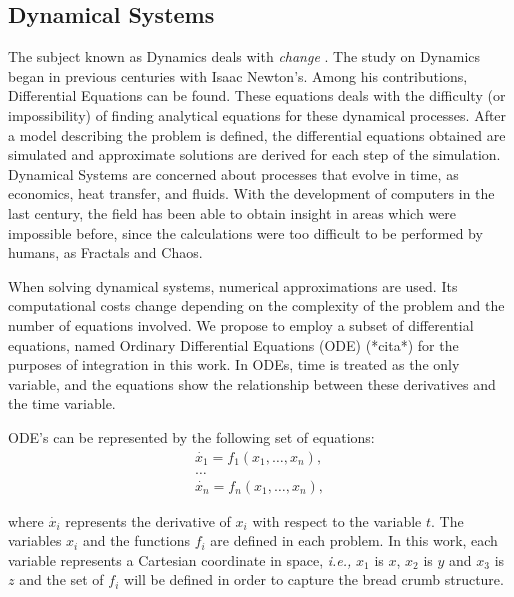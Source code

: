 \documentclass[oneside,a4paper,english,links]{amca}
\begin{document}
\subsection{Dynamical Systems}

The subject known as Dynamics deals with {\em change} \citep{Strogatz2001}. The study on Dynamics began in previous centuries with Isaac Newton's. Among his contributions, Differential Equations can be found. These equations deals with the difficulty (or impossibility) of finding analytical equations for these dynamical processes. After a model describing the problem is defined, the differential equations obtained are simulated and approximate solutions are derived for each step of the simulation. Dynamical Systems are concerned about processes that evolve in time, as economics, heat transfer, and fluids. With the development of computers in the last century, the field has been able to obtain insight in areas which were impossible before, since the calculations were too difficult to be performed by humans, as Fractals \citep{Mandelbrot83} and Chaos.

When solving dynamical systems, numerical approximations are used. Its computational costs change depending on the complexity of the problem and the number of equations involved. We propose to employ a subset of differential equations, named Ordinary Differential Equations (ODE) (*cita*) for the purposes of integration in this work. In ODEs, time is treated as the only variable, and the equations show the relationship between these derivatives and the time variable. 

ODE's can be represented by the following set of equations:
\begin{equation} \label{eq:simple}  
\begin{aligned}
\dot{x_{1}} = f_{1}(x_{1},\ldots,x_{n}),\\
\ldots\\
\dot{x_{n}} = f_{n}(x_{1},\ldots,x_{n}),
\end{aligned}
\end{equation}

where $\dot{x_{i}}$ represents the derivative of $x_{i}$ with respect to the variable $t$. The variables $x_{i}$ and the functions $f_{i}$ are defined in each problem. In this work, each variable represents a Cartesian coordinate in space, {\em i.e.,} $x_{1}$ is $x$, $x_{2}$ is $y$ and $x_{3}$ is $z$ and the set of $f_{i}$ will be defined in order to capture the bread crumb structure.
\end{document}
